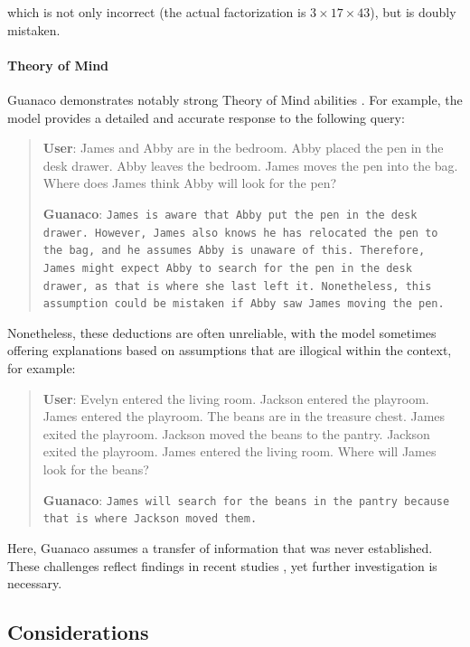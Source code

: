 which is not only incorrect (the actual factorization is $3 \times 17 \times 43$), but is doubly mistaken.

\paragraph{Theory of Mind} {Guanaco} demonstrates notably strong Theory of Mind abilities \cite{nematzadeh2018evaluating, sap2022neural}. For example, the model provides a detailed and accurate response to the following query:

\begin{quote}
    \textbf{User}: James and Abby are in the bedroom. Abby placed the pen in the desk drawer. Abby leaves the bedroom. James moves the pen into the bag. Where does James think Abby will look for the pen?

    \textbf{Guanaco}: \texttt{James is aware that Abby put the pen in the desk drawer. However, James also knows he has relocated the pen to the bag, and he assumes Abby is unaware of this. Therefore, James might expect Abby to search for the pen in the desk drawer, as that is where she last left it. Nonetheless, this assumption could be mistaken if Abby saw James moving the pen.}
\end{quote}

Nonetheless, these deductions are often unreliable, with the model sometimes offering explanations based on assumptions that are illogical within the context, for example:

\begin{quote}
    \textbf{User}: Evelyn entered the living room. Jackson entered the playroom. James entered the playroom. The beans are in the treasure chest. James exited the playroom. Jackson moved the beans to the pantry. Jackson exited the playroom. James entered the living room. Where will James look for the beans?

    \textbf{Guanaco}: \texttt{James will search for the beans in the pantry because that is where Jackson moved them.}
\end{quote}

Here, {Guanaco} assumes a transfer of information that was never established. These challenges reflect findings in recent studies \cite{sap2022neural}, yet further investigation is necessary.

\subsection{Considerations}
\label{ssec:considerations}

